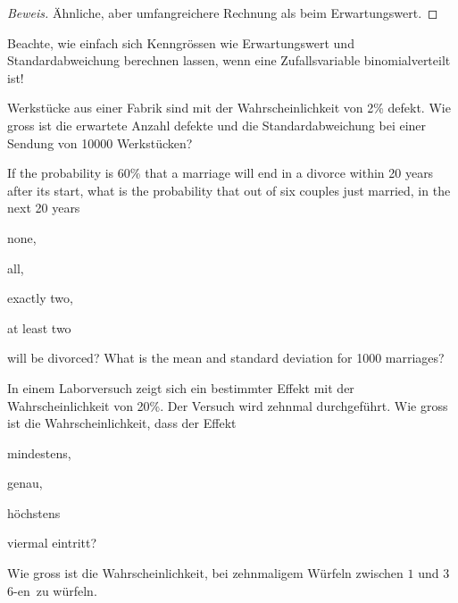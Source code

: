 \documentclass[%
11pt,%
twoside,%
titlepage,%
german,%
headsepline%
]{scrartcl}
\begin{document}
\begin{proof}[Beweis]
Ähnliche, aber umfangreichere Rechnung als beim Erwartungswert.
\end{proof}

\begin{bem}
Beachte, wie einfach sich Kenngrössen wie Erwartungswert und Standardabweichung berechnen lassen, wenn eine Zufallsvariable binomialverteilt ist!
\end{bem}

\begin{ueb}
Werkstücke aus einer Fabrik sind mit der Wahrscheinlichkeit von 2\% defekt. Wie gross ist die erwartete Anzahl defekte und die Standardabweichung bei einer Sendung von 10000 Werkstücken?
\end{ueb}

\begin{ueb}
If the probability is 60\% that a marriage will end in a divorce within 20 years after its start, what is the probability that out of six couples just married, in the next 20 years
\begin{enumeratea}
\item none,
\item all,
\item exactly two,
\item at least two
\end{enumeratea}
will be divorced? What is the mean and standard deviation for 1000
marriages?
\end{ueb}

\begin{ueb}
In einem Laborversuch zeigt sich ein bestimmter Effekt mit der Wahrscheinlichkeit von 20\%. Der Versuch wird zehnmal durchgeführt. Wie gross ist die Wahrscheinlichkeit, dass der Effekt
\begin{enumeratea}
\item mindestens,
\item genau,
\item höchstens
\end{enumeratea}
viermal eintritt?
\end{ueb}

\begin{ueb}
Wie gross ist die Wahrscheinlichkeit, bei zehnmaligem Würfeln zwischen $1$ und $3$ \glqq $6$-en\grqq\ zu würfeln.
\end{ueb}

\clearpage
\end{document}
